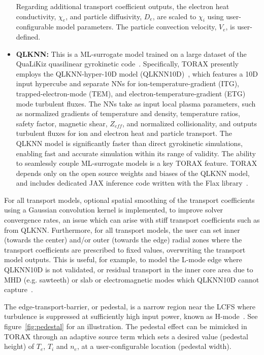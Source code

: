\documentclass[aps, reprint, nofootinbib]{revtex4-2}
\begin{document}
\begin{itemize}
Regarding additional transport coefficient outputs, the electron heat conductivity, $\chi_e$, and particle diffusivity, $D_e$, are scaled to $\chi_i$ using user-configurable model parameters. The particle convection velocity, $V_e$, is user-defined.

\item \textbf{QLKNN:} This is a ML-surrogate model trained on a large dataset of the QuaLiKiz quasilinear gyrokinetic code~\cite{bourdelle:2015,citrin:2017}. Specifically, TORAX presently employs the QLKNN-hyper-10D model (QLKNN10D)~\cite{vandeplassche:2020}, which features a 10D input hypercube and separate NNs for ion-temperature-gradient (ITG), trapped-electron-mode (TEM), and electron-temperature-gradient (ETG) mode turbulent fluxes. The NNs take as input local plasma parameters, such as normalized gradients of temperature and density, temperature ratios, safety factor, magnetic shear, $Z_{eff}$, and normalized collisionality, and outputs turbulent fluxes for ion and electron heat and particle transport. The QLKNN model is significantly faster than direct gyrokinetic simulations, enabling fast and accurate simulation within its range of validity. The ability to seamlessly couple ML-surrogate models is a key TORAX feature. TORAX depends only on the open source weights and biases of the QLKNN model, and includes dedicated JAX inference code written with the Flax library~\cite{flax:2020}.
\end{itemize}

For all transport models, optional spatial smoothing of the transport coefficients using a Gaussian convolution kernel is implemented, to improve solver convergence rates, an issue which can arise with stiff transport coefficients such as from QLKNN. Furthermore, for all transport models, the user can set inner (towards the center) and/or outer (towards the edge) radial zones where the transport coefficients are prescribed to fixed values, overwriting the transport model outputs. This is useful, for example, to model the L-mode edge where QLKNN10D is not validated, or residual transport in the inner core area due to MHD (e.g. sawteeth) or slab or electromagnetic modes which QLKNN10D cannot capture~\cite{kumar:2021}.

The edge-transport-barrier, or pedestal, is a narrow region near the LCFS where turbulence is suppressed at sufficiently high input power, known as H-mode~\cite{Wagner_PRL82}. See figure~\ref{fig:pedestal} for an illustration. The pedestal effect can be mimicked in TORAX through an adaptive source term which sets a desired value (pedestal height) of $T_e$, $T_i$ and $n_e$, at a user-configurable location (pedestal width).
\end{document}
